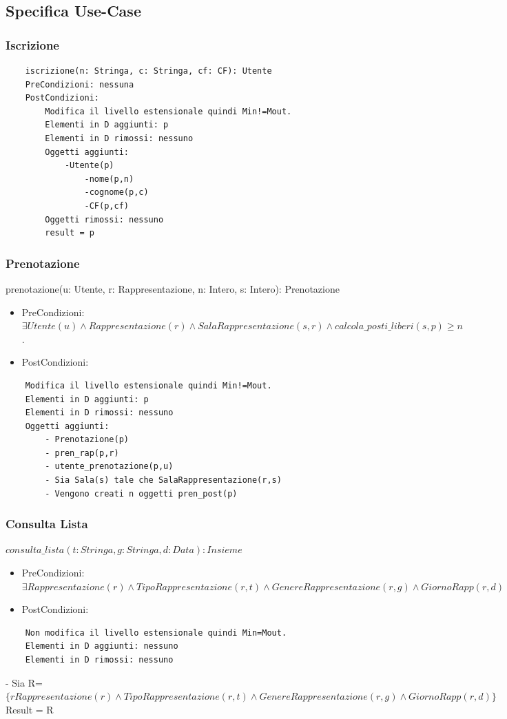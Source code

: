 \documentclass[12pt, letterpaper]{article}
\begin{document}
\subsection{Specifica Use-Case}
\subsubsection{Iscrizione}
\begin{verbatim}
    iscrizione(n: Stringa, c: Stringa, cf: CF): Utente
    PreCondizioni: nessuna
    PostCondizioni:
        Modifica il livello estensionale quindi Min!=Mout.
        Elementi in D aggiunti: p
        Elementi in D rimossi: nessuno
        Oggetti aggiunti: 
            -Utente(p)
                -nome(p,n)
                -cognome(p,c)
                -CF(p,cf)
        Oggetti rimossi: nessuno
        result = p
\end{verbatim}
\subsubsection{Prenotazione}
prenotazione(u: Utente, r: Rappresentazione, n: Intero, s: Intero): Prenotazione
    \begin{itemize}
        \item PreCondizioni:\\ $\exists Utente(u) \land  Rappresentazione(r) \land SalaRappresentazione(s,r) \land calcola\_posti\_liberi(s,p) \ge n$.
        \item PostCondizioni:
    \end{itemize}
\begin{verbatim}
    Modifica il livello estensionale quindi Min!=Mout.
    Elementi in D aggiunti: p
    Elementi in D rimossi: nessuno
    Oggetti aggiunti: 
        - Prenotazione(p)
        - pren_rap(p,r)
        - utente_prenotazione(p,u)
        - Sia Sala(s) tale che SalaRappresentazione(r,s)
        - Vengono creati n oggetti pren_post(p)
\end{verbatim}
\newpage
\subsubsection{Consulta Lista}
$consulta\_lista(t:Stringa, g: Stringa, d: Data): Insieme$
\begin{itemize}
    \item PreCondizioni: \\ $\exists Rappresentazione(r) \land TipoRappresentazione(r,t) \land GenereRappresentazione(r,g) \land GiornoRapp(r,d)$\\
    \item PostCondizioni: 
\end{itemize}
\begin{verbatim}
    Non modifica il livello estensionale quindi Min=Mout.
    Elementi in D aggiunti: nessuno
    Elementi in D rimossi: nessuno
\end{verbatim}
    - Sia R=$\{r Rappresentazione(r) \land TipoRappresentazione(r,t) \land GenereRappresentazione(r,g) \land GiornoRapp(r,d)\}$
    Result = R
\end{document}
